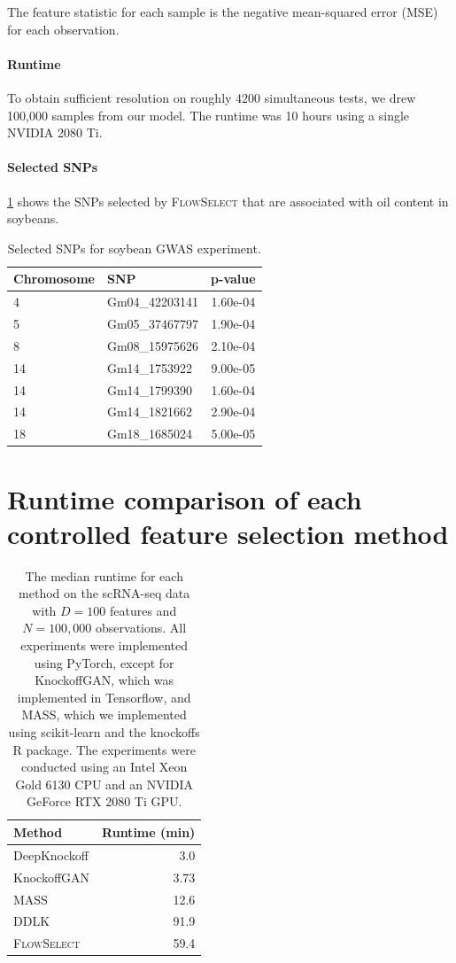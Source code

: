 \documentclass{article}
\newcommand{\FlowSelect}{\textsc{FlowSelect}\xspace}
\begin{document}
The feature statistic for each sample is the negative mean-squared error (MSE) for each observation.

\paragraph{Runtime}
To obtain sufficient resolution on roughly $4200$ simultaneous tests, we drew 100,000 samples from our model. The runtime was 10 hours using a single NVIDIA 2080 Ti.

\paragraph{Selected SNPs}
\cref{tab:soybean_snps} shows the SNPs selected by \FlowSelect that are associated with oil content in soybeans.
\begin{table}[ht]
\centering
\begin{tabular}{llc}
  \toprule
Chromosome & SNP & p-value \\
  \hline
 4 & Gm04\_42203141 & 1.60e-04 \\
   5 & Gm05\_37467797 & 1.90e-04 \\
   8 & Gm08\_15975626 & 2.10e-04 \\
  14 & Gm14\_1753922 & 9.00e-05 \\
  14 & Gm14\_1799390 & 1.60e-04 \\
  14 & Gm14\_1821662 & 2.90e-04 \\
  18 & Gm18\_1685024 & 5.00e-05 \\
   \bottomrule
\end{tabular}
\vspace{1.5mm}
\caption{Selected SNPs for soybean GWAS experiment.}
\label{tab:soybean_snps}
\end{table}
\clearpage

\section{Runtime comparison of each controlled feature selection method} \label{sec:runtimes}
\begin{table}[h!]
\centering
\begin{tabular}{lr}
  \toprule
 Method & Runtime (min) \\
  \midrule
DeepKnockoff & 3.0  \\
KnockoffGAN & 3.73 \\
MASS & 12.6 \\
DDLK & 91.9  \\
\FlowSelect & 59.4 \\
   \bottomrule
\end{tabular}
\caption{The median runtime for each method on the scRNA-seq data with $D=100$ features and $N=100,000$ observations.
All experiments were implemented using PyTorch, except for KnockoffGAN, which was implemented in Tensorflow, and MASS, which we implemented using scikit-learn and the knockoffs R package.
The experiments were conducted using an Intel Xeon Gold 6130 CPU and an NVIDIA GeForce RTX 2080 Ti GPU.
}
\label{tbl:rnasq_runtimes}
\end{table}
\end{document}
